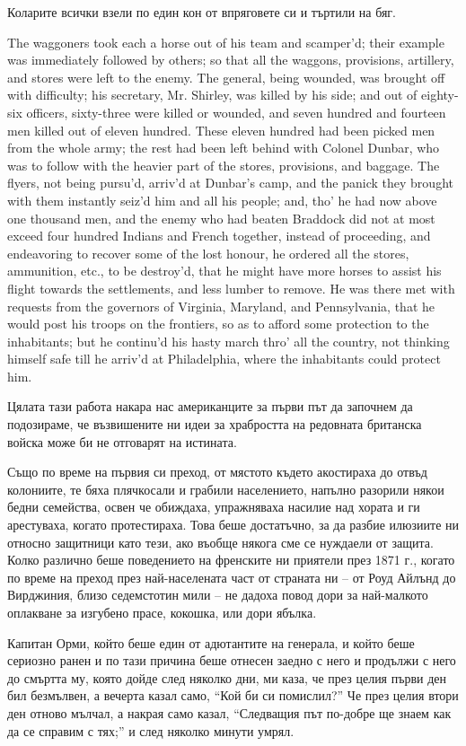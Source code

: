 \documentclass[12pt]{book}
\begin{document}
Коларите всички взели по един кон от впряговете си и търтили на бяг.

The waggoners took each a horse out of his team and scamper'd; their
example was immediately followed by others; so that all the waggons,
provisions, artillery, and stores were left to the enemy.  The general,
being wounded, was brought off with difficulty; his secretary, Mr.
Shirley, was killed by his side; and out of eighty-six officers,
sixty-three were killed or wounded, and seven hundred and fourteen men
killed out of eleven hundred.  These eleven hundred had been picked men
from the whole army; the rest had been left behind with Colonel Dunbar,
who was to follow with the heavier part of the stores, provisions, and
baggage.  The flyers, not being pursu'd, arriv'd at Dunbar's camp, and
the panick they brought with them instantly seiz'd him and all his
people; and, tho' he had now above one thousand men, and the enemy who
had beaten Braddock did not at most exceed four hundred Indians and
French together, instead of proceeding, and endeavoring to recover some
of the lost honour, he ordered all the stores, ammunition, etc., to be
destroy'd, that he might have more horses to assist his flight towards
the settlements, and less lumber to remove.  He was there met with
requests from the governors of Virginia, Maryland, and Pennsylvania,
that he would post his troops on the frontiers, so as to afford some
protection to the inhabitants; but he continu'd his hasty march thro'
all the country, not thinking himself safe till he arriv'd at
Philadelphia, where the inhabitants could protect him. 

Цялата тази работа накара нас американците за първи път да започнем да подозираме, че възвишените ни идеи за храбростта на редовната британска войска може би не отговарят на истината.

Също по време на първия си преход, от мястото където акостираха до отвъд колониите, те бяха плячкосали и грабили населението, напълно разорили някои бедни семейства, освен че обиждаха, упражняваха насилие над хората и ги арестуваха, когато протестираха. Това беше достатъчно, за да разбие илюзиите ни относно защитници като тези, ако въобще някога сме се нуждаели от защита. Колко различно беше поведението на френските ни приятели през 1871 г., когато по време на преход през най-населената част от страната ни – от Роуд Айлънд до Вирджиния, близо седемстотин мили – не дадоха повод дори за най-малкото оплакване за изгубено прасе, кокошка, или дори ябълка. 

Капитан Орми, който беше един от адютантите на генерала, и който беше сериозно ранен и по тази причина беше отнесен заедно с него и продължи с него до смъртта му, която дойде след няколко дни, ми каза, че през целия първи ден бил безмълвен, а вечерта казал само, “Кой би си помислил?” Че през целия втори ден отново мълчал, а накрая само казал, “Следващия път по-добре ще знаем как да се справим с тях;” и след няколко минути умрял.
\end{document}
